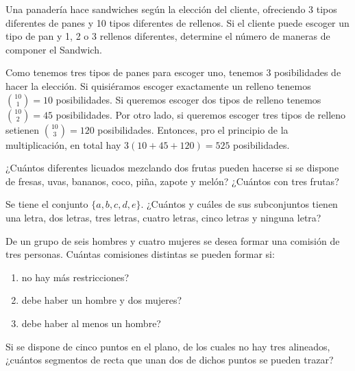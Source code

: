 \documentclass[12pt]{article}
\begin{document}
\begin{problema}
    Una panadería hace sandwiches según la elección del cliente, ofreciendo 3 tipos diferentes de panes y 10 tipos diferentes de rellenos. Si  el  cliente  puede  escoger  un  tipo  de  pan  y  1,  2  o  3  rellenos  diferentes, determine el número de maneras de componer el Sandwich.
\end{problema}

\begin{solucion}
    Como tenemos tres tipos de panes para escoger uno, tenemos  3  posibilidades  de  hacer  la  elección.  Si  quisiéramos  escoger exactamente  un  relleno  tenemos $\binom{10}{1}=10$  posibilidades. Si queremos  escoger  dos  tipos  de  relleno  tenemos $\binom{10}{2}=45$ posibilidades.   Por  otro  lado,  si  queremos  escoger  tres  tipos  de  relleno  setienen $\binom{10}{3}=120$ posibilidades. Entonces, pro el principio de la multiplicación, en total hay $3(10+45+120)=525$ posibilidades.
\end{solucion}

\begin{problema}
    ¿Cuántos diferentes licuados mezclando dos frutas pueden hacerse si se dispone de fresas, uvas, bananos, coco, piña, zapote y melón? ¿Cuántos con tres frutas?
\end{problema}

\begin{problema}
    Se tiene el conjunto $\{a, b, c, d, e\}$. ¿Cuántos y cuáles de sus subconjuntos tienen una letra, dos letras, tres letras, cuatro letras, cinco letras y ninguna letra?
\end{problema}

\begin{problema}
    De un grupo de seis hombres y cuatro mujeres se desea formar una comisión de tres personas. Cuántas comisiones distintas se pueden formar si:

    \renewcommand{\labelenumi}{\alph{enumi})}
    \begin{enumerate}
        \item no hay más restricciones?
        \item debe haber un hombre y dos mujeres?
        \item debe haber al menos un hombre?
    \end{enumerate}
\end{problema}

\begin{problema}
    Si se dispone de cinco puntos en el plano, de los cuales no hay tres alineados, ¿cuántos segmentos de recta que unan dos de dichos puntos se pueden trazar?
\end{problema}
\end{document}
